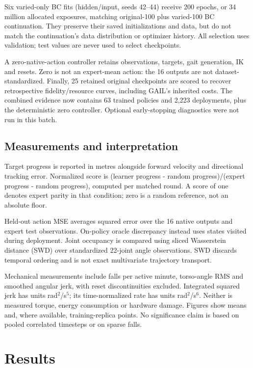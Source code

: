 \documentclass[conference]{IEEEtran}
\begin{document}
Six varied-only BC fits (hidden/input, seeds 42--44) receive 200 epochs, or 34 million allocated exposures, matching original-100 plus varied-100 BC continuation. They preserve their saved initializations and data, but do not match the continuation's data distribution or optimizer history. All selection uses validation; test values are never used to select checkpoints.

A zero-native-action controller retains observations, targets, gait generation, IK and resets. Zero is not an expert-mean action: the 16 outputs are not dataset-standardized. Finally, 25 retained original checkpoints are scored to recover retrospective fidelity/resource curves, including GAIL's inherited costs. The combined evidence now contains 63 trained policies and 2,223 deployments, plus the deterministic zero controller. Optional early-stopping diagnostics were not run in this batch.

\subsection{Measurements and interpretation}

Target progress is reported in metres alongside forward velocity and directional tracking error. Normalized score is (learner progress - random progress)/(expert progress - random progress), computed per matched round. A score of one denotes expert parity in that condition; zero is a random reference, not an absolute floor.

Held-out action MSE averages squared error over the 16 native outputs and expert test observations. On-policy oracle discrepancy instead uses states visited during deployment. Joint occupancy is compared using sliced Wasserstein distance (SWD) over standardized 22-joint angle observations. SWD discards temporal ordering and is not exact multivariate trajectory transport.

Mechanical measurements include falls per active minute, torso-angle RMS and smoothed angular jerk, with reset discontinuities excluded. Integrated squared jerk has units rad$^2$/s$^5$; its time-normalized rate has units rad$^2$/s$^6$. Neither is measured torque, energy consumption or hardware damage. Figures show means and, where available, training-replica points. No significance claim is based on pooled correlated timesteps or on sparse falls.

\section{Results}
\end{document}

